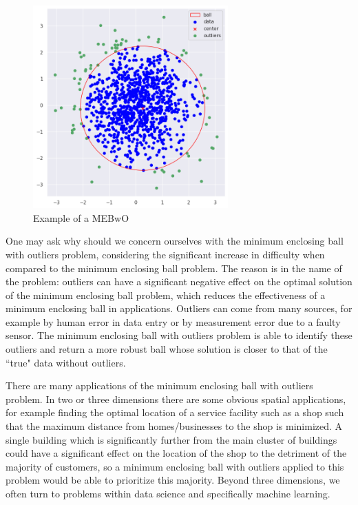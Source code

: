 \documentclass[11pt,twoside]{report}
\theoremstyle{definition}
\numberwithin{theorem}{section}
\numberwithin{definition}{section}
\numberwithin{lemma}{section}
\numberwithin{proposition}{section}
\numberwithin{equation}{section}
\numberwithin{figure}{section}
\begin{document}
\begin{figure}[ht]
    \centering
    \includegraphics[width=0.6666\textwidth]{images/sample_mebwo.png}
    \caption{Example of a MEBwO}
    \label{fig:mebwo}
\end{figure}

One may ask why should we concern ourselves with the minimum enclosing ball with outliers problem, considering the significant increase in difficulty when compared to the minimum enclosing ball problem. The reason is in the name of the problem: outliers can have a significant negative effect on the optimal solution of the minimum enclosing ball problem, which reduces the effectiveness of a minimum enclosing ball in applications. Outliers can come from many sources, for example by human error in data entry or by measurement error due to a faulty sensor. The minimum enclosing ball with outliers problem is able to identify these outliers and return a more robust ball whose solution is closer to that of the ``true" data without outliers.

There are many applications of the minimum enclosing ball with outliers problem. In two or three dimensions there are some obvious spatial applications, for example finding the optimal location of a service facility such as a shop such that the maximum distance from homes/businesses to the shop is minimized. A single building which is significantly further from the main cluster of buildings could have a significant effect on the location of the shop to the detriment of the majority of customers, so a minimum enclosing ball with outliers applied to this problem would be able to prioritize this majority. Beyond three dimensions, we often turn to problems within data science and specifically machine learning.
\end{document}
